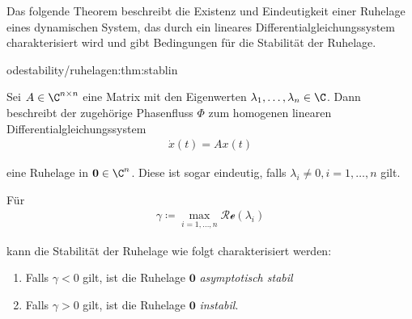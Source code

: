 \documentclass[letterpaper,10pt,english]{jupyterBook}
\begin{document}
\par
Das folgende Theorem beschreibt die Existenz und Eindeutigkeit einer Ruhelage eines dynamischen System, das durch ein lineares Differentialgleichungssystem charakterisiert wird und gibt Bedingungen für die Stabilität der Ruhelage.
\begin{theorem}{}{odestability/ruhelagen:thm:stablin}



\par
Sei \(A\in \C^{n\times n}\) eine Matrix mit den Eigenwerten \(\lambda_1,\dots, \lambda_n\in \C\).
Dann beschreibt der zugehörige Phasenfluss \(\Phi\) zum homogenen linearen Differentialgleichungssystem
\begin{align*}
\dot{x}(t) = Ax(t)
\end{align*}
\par
eine Ruhelage in \(\mathbf{0} \in \C^n\).
Diese ist sogar eindeutig, falls \(\lambda_i\neq 0, i=1,\ldots,n\) gilt.

\par
Für
\begin{align*}
\gamma \coloneqq \max_{i=1,\dots,n} \mathcal{Re}(\lambda_i)
\end{align*}
\par
kann die Stabilität der Ruhelage wie folgt charakterisiert werden:
\begin{enumerate}

\item {} 
\par
Falls \(\gamma <0\) gilt, ist die Ruhelage \(\mathbf{0}\) \emph{asymptotisch stabil}

\item {} 
\par
Falls \(\gamma >0\) gilt, ist die Ruhelage \(\mathbf{0}\) \emph{instabil}.

\end{enumerate}
\end{theorem}
\end{document}

